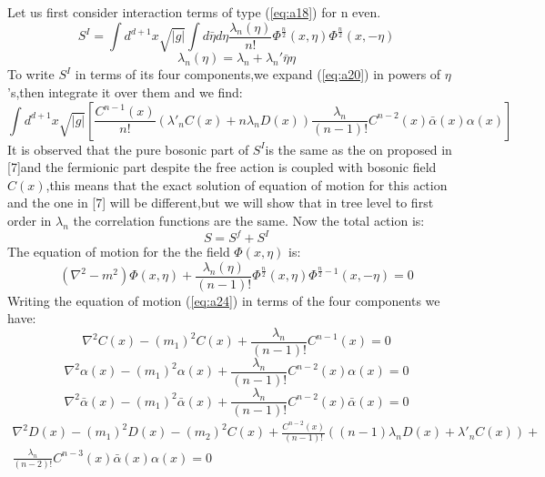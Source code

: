 \documentclass[a4paper,12pt]{article}
\begin{document}
 Let us first
consider interaction terms of type (\ref{eq:a18}) for n even.
\begin{equation}\label{eq:a20}
S^{I}=\int d^{d+1}x\sqrt{|g|}\int
d\bar{\eta}d\eta\frac{\lambda_{n}(\eta)}{n!}
\Phi^\frac{n}{2}(x,\eta)\Phi^\frac{n}{2}(x,-\eta)
\end{equation}
\begin{equation}
\lambda_{n}(\eta)=\lambda_{n}+\lambda_{n}'\bar{\eta}\eta
\end{equation}
 To write $S^{I}$ in terms of its four components,we
expand (\ref{eq:a20}) in powers of $\eta$'s,then integrate it
over them and we find:
\begin{equation}
\int d^{d+1}x\sqrt{|g|}[\frac{C^{n-1}(x)}{n!}
(\lambda'_{n}C(x)+n\lambda_{n}D(x))\frac{\lambda_{n}}{(n-1)!}
C^{n-2}(x)\bar{\alpha}(x)\alpha(x)]
\end{equation} It is
observed that the pure bosonic part of $S^{I}$is the same as the
on proposed in [7]and the fermionic part despite the free action
is coupled with bosonic field $C(x)$,this means that the exact
solution of equation of motion for this action and the one in [7]
will be different,but we will show that in tree level to first
order in $\lambda_{n}$ the correlation functions are the same.
 Now the total action is:
 \begin{equation}
 S=S^{f}+S^{I}
 \end{equation}
 The equation of motion for the the field $\Phi(x,\eta)$ is:
 \begin{equation}\label{eq:a24}
 (\nabla^{2}-m^{2})\Phi(x,\eta)+\frac{\lambda_{n}(\eta)}{(n-1)!}\Phi^{\frac{n}{2}}(x,\eta)\Phi^{\frac{n}{2}-1}(x,-\eta)=0
 \end{equation}
 Writing the equation of motion (\ref{eq:a24}) in terms of the four
 components we have:
 \begin{equation}\nabla^{2}C(x)-(m_{1})^{2}C(x)+\frac{\lambda_{n}}{(n-1)!}C^{n-1}(x)=0
\end{equation}
\begin{equation}
\nabla^{2}\alpha(x)-(m_{1})^{2}\alpha(x)+\frac{\lambda_{n}}{(n-1)!}C^{n-2}(x)\alpha(x)=0
\end{equation}
 \begin{equation}
 \nabla^{2}\bar{\alpha}(x)-(m_{1})^{2}\bar{\alpha}(x)+\frac{\lambda_{n}}{(n-1)!}C^{n-2}(x)\bar{\alpha}(x)=0
 \end{equation}
 \begin{eqnarray}\nabla^{2}D(x)-(m_{1})^{2}D(x)-(m_{2})^{2}C(x)+\frac{C^{n-2}(x)}{(n-1)!}((n-1)\lambda_{n}D(x)+\lambda'_{n}C(x))+\nonumber\\
   \frac{\lambda_{n}}{(n-2)!}C^{n-3}(x)\bar{\alpha}(x)\alpha(x)=0
\end{eqnarray}
\end{document}
